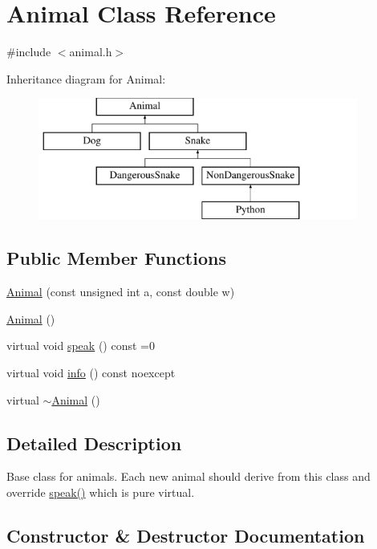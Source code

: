 \hypertarget{classAnimal}{}\section{Animal Class Reference}
\label{classAnimal}


{\ttfamily \#include $<$animal.\+h$>$}

Inheritance diagram for Animal\+:\begin{figure}[H]
\begin{center}
\leavevmode
\includegraphics[height=4.000000cm]{classAnimal}
\end{center}
\end{figure}
\subsection*{Public Member Functions}
\begin{DoxyCompactItemize}
\item 
\hyperlink{classAnimal_aaf54366e9bfa8730f100fd25b99b864f}{Animal} (const unsigned int a, const double w)
\item 
\hyperlink{classAnimal_a1e726a49ec952443190ac62dad22353c}{Animal} ()
\item 
virtual void \hyperlink{classAnimal_ae3f640ffd5ebec66c3836b63fd11fc27}{speak} () const =0
\item 
virtual void \hyperlink{classAnimal_a72994a2bb769667d277845351462246f}{info} () const noexcept
\item 
virtual \hyperlink{classAnimal_a16d8b7f94611cc65f5cdb58cc105527b}{$\sim$\+Animal} ()
\end{DoxyCompactItemize}


\subsection{Detailed Description}
Base class for animals. Each new animal should derive from this class and override {\ttfamily \hyperlink{classAnimal_ae3f640ffd5ebec66c3836b63fd11fc27}{speak()}} which is pure virtual. 

\subsection{Constructor \& Destructor Documentation}
\mbox{\label{classAnimal_aaf54366e9bfa8730f100fd25b99b864f}} 
